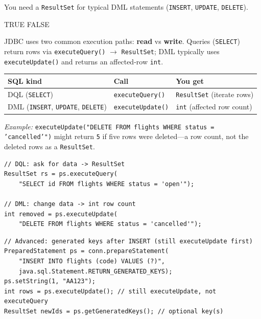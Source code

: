 \question[4]
You need a \texttt{ResultSet} for typical DML statements (\texttt{INSERT}, \texttt{UPDATE}, \texttt{DELETE}).
\begin{choices}
  \choice TRUE
  \CorrectChoice FALSE
\end{choices}
\begin{solution}
  JDBC uses two common execution paths: \textbf{read} vs \textbf{write}. Queries (\texttt{SELECT}) return rows via \texttt{executeQuery()} $\rightarrow$ \texttt{ResultSet}; DML typically uses \texttt{executeUpdate()} and returns an affected-row \texttt{int}.

  \begin{center}
  \footnotesize
  \renewcommand{\arraystretch}{1.15}
  \begin{tabular}{@{}lll@{}}
    \hline
    \textbf{SQL kind} & \textbf{Call} & \textbf{You get} \\
    \hline
    DQL (\texttt{SELECT}) & \texttt{executeQuery()} & \texttt{ResultSet} (iterate rows) \\
    DML (\texttt{INSERT}, \texttt{UPDATE}, \texttt{DELETE}) & \texttt{executeUpdate()} & \texttt{int} (affected row count) \\
    \hline
  \end{tabular}
  \renewcommand{\arraystretch}{1}
  \end{center}

  \noindent\textit{Example:} \texttt{executeUpdate("DELETE FROM flights WHERE status = 'cancelled'")} might return \texttt{5} if five rows were deleted---a row count, not the deleted rows as a \texttt{ResultSet}.

\begin{lstlisting}[style=java]
// DQL: ask for data -> ResultSet
ResultSet rs = ps.executeQuery(
    "SELECT id FROM flights WHERE status = 'open'");

// DML: change data -> int row count
int removed = ps.executeUpdate(
    "DELETE FROM flights WHERE status = 'cancelled'");
\end{lstlisting}

\begin{lstlisting}[style=java]
// Advanced: generated keys after INSERT (still executeUpdate first)
PreparedStatement ps = conn.prepareStatement(
    "INSERT INTO flights (code) VALUES (?)",
    java.sql.Statement.RETURN_GENERATED_KEYS);
ps.setString(1, "AA123");
int rows = ps.executeUpdate(); // still executeUpdate, not executeQuery
ResultSet newIds = ps.getGeneratedKeys(); // optional key(s)
\end{lstlisting}
\end{solution}

